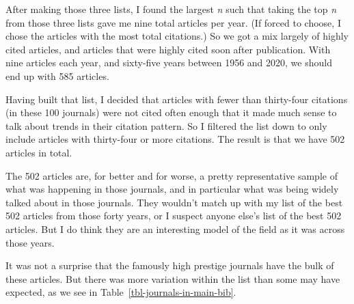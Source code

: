 \documentclass[
  10pt,
  letterpaper,
  DIV=11,
  numbers=noendperiod,
  twoside]{scrartcl}
\begin{document}
After making those three lists, I found the largest \emph{n} such that
taking the top \emph{n} from those three lists gave me nine total
articles per year. (If forced to choose, I chose the articles with the
most total citations.) So we got a mix largely of highly cited articles,
and articles that were highly cited soon after publication. With nine
articles each year, and sixty-five years between 1956 and 2020, we
should end up with 585 articles.

Having built that list, I decided that articles with fewer than
thirty-four citations (in these 100 journals) were not cited often
enough that it made much sense to talk about trends in their citation
pattern. So I filtered the list down to only include articles with
thirty-four or more citations. The result is that we have 502 articles
in total.

The 502 articles are, for better and for worse, a pretty representative
sample of what was happening in those journals, and in particular what
was being widely talked about in those journals. They wouldn't match up
with my list of the best 502 articles from those forty years, or I
suspect anyone else's list of the best 502 articles. But I do think they
are an interesting model of the field as it was across those years.

It was not a surprise that the famously high prestige journals have the
bulk of these articles. But there was more variation within the list
than some may have expected, as we see in
Table~\ref{tbl-journals-in-main-bib}.
\end{document}
